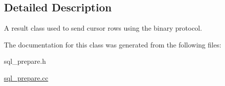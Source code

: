 \subsection{Detailed Description}
A result class used to send cursor rows using the binary protocol. 

The documentation for this class was generated from the following files\+:\begin{DoxyCompactItemize}
\item 
sql\+\_\+prepare.\+h\item 
\mbox{\hyperlink{sql__prepare_8cc}{sql\+\_\+prepare.\+cc}}\end{DoxyCompactItemize}
